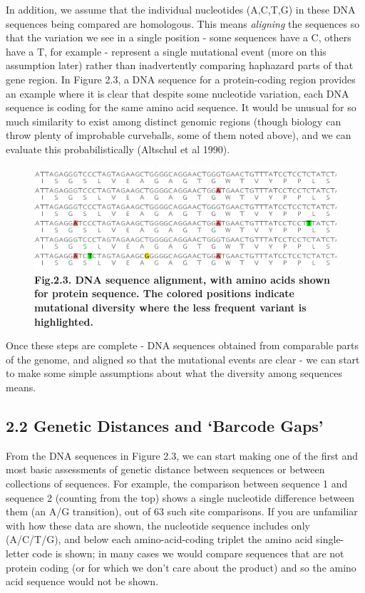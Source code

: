 \documentclass[
]{article}
\begin{document}
In addition, we assume that the individual nucleotides (A,C,T,G) in
these DNA sequences being compared are homologous. This means
\emph{aligning} the sequences so that the variation we see in a single
position - some sequences have a C, others have a T, for example -
represent a single mutational event (more on this assumption later)
rather than inadvertently comparing haphazard parts of that gene region.
In Figure 2.3, a DNA sequence for a protein-coding region provides an
example where it is clear that despite some nucleotide variation, each
DNA sequence is coding for the same amino acid sequence. It would be
unusual for so much similarity to exist among distinct genomic regions
(though biology can throw plenty of improbable curveballs, some of them
noted above), and we can evaluate this probabilistically (Altschul et al
1990).

\begin{figure}
\centering
\includegraphics{MEImages/DNAalign.jpg}
\caption{\textbf{Fig.2.3. DNA sequence alignment, with amino acids shown
for protein sequence. The colored positions indicate mutational
diversity where the less frequent variant is highlighted.}}
\end{figure}

Once these steps are complete - DNA sequences obtained from comparable
parts of the genome, and aligned so that the mutational events are clear
- we can start to make some simple assumptions about what the diversity
among sequences means.

\hypertarget{genetic-distances-and-barcode-gaps}{%
\subsection{2.2 Genetic Distances and `Barcode
Gaps'}\label{genetic-distances-and-barcode-gaps}}

From the DNA sequences in Figure 2.3, we can start making one of the
first and most basic assessments of genetic distance between sequences
or between collections of sequences. For example, the comparison between
sequence 1 and sequence 2 (counting from the top) shows a single
nucleotide difference between them (an A/G transition), out of 63 such
site comparisons. If you are unfamiliar with how these data are shown,
the nucleotide sequence includes only (A/C/T/G), and below each
amino-acid-coding triplet the amino acid single-letter code is shown; in
many cases we would compare sequences that are not protein coding (or
for which we don't care about the product) and so the amino acid
sequence would not be shown.
\end{document}
